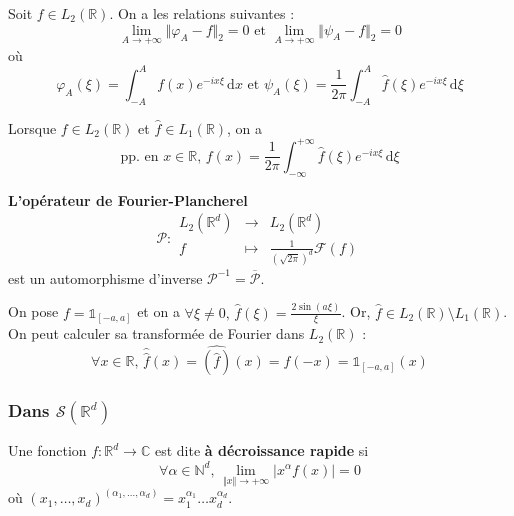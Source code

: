 	\begin{proposition}
		Soit $f \in L_2(\mathbb{R})$. On a les relations suivantes :
		\[ \lim_{A \rightarrow +\infty} \Vert \varphi_A - f \Vert_2 = 0 \text{ et } \lim_{A \rightarrow +\infty} \Vert \psi_A - f \Vert_2 = 0 \]
		où
		\[ \varphi_A(\xi) = \int_{-A}^{A} f(x) e^{-ix\xi} \, \mathrm{d}x \text{ et } \psi_A(\xi) = \frac{1}{2 \pi} \int_{-A}^{A} \widehat{f}(\xi) e^{-ix\xi} \, \mathrm{d}\xi \]
	\end{proposition}
	
	\begin{corollary}
		Lorsque $f \in L_2(\mathbb{R})$ et $\widehat{f} \in L_1(\mathbb{R})$, on a
		\[ \text{pp. en } x \in \mathbb{R}, \, f(x) = \frac{1}{2 \pi} \int_{-\infty}^{+\infty} \widehat{f}(\xi) e^{-ix\xi} \, \mathrm{d}\xi \]
	\end{corollary}
	
	\begin{theorem}
		\textbf{L'opérateur de Fourier-Plancherel}
		\[
		\mathcal{P} :
		\begin{array}{ccc}
			L_2(\mathbb{R}^d) &\rightarrow& L_2(\mathbb{R}^d) \\
			f &\mapsto& \frac{1}{(\sqrt{2 \pi})^d} \mathcal{F}(f)
		\end{array}
		\]
		est un automorphisme d'inverse $\mathcal{P}^{-1} = \overline{\mathcal{P}}$.
	\end{theorem}
	
	
	\begin{example}
		On pose $f = \mathbb{1}_{[-a, a]}$ et on a $\forall \xi \neq 0, \, \widehat{f}(\xi) = \frac{2 \sin(a\xi)}{\xi}$. Or, $\widehat{f} \in L_2(\mathbb{R}) \setminus L_1(\mathbb{R})$. On peut calculer sa transformée de Fourier dans $L_2(\mathbb{R})$ :
		\[ \forall x \in \mathbb{R}, \, \widehat{\widehat{f}}(x) = \widehat{(\widehat{f})}(x) = f(-x) = \mathbb{1}_{[-a, a]}(x) \]
	\end{example}
	
	\subsubsection{Dans \texorpdfstring{$\mathcal{S}(\mathbb{R}^d)$}{S(Rᵈ)}}
	
	
	\begin{definition}
		Une fonction $f : \mathbb{R}^d \rightarrow \mathbb{C}$ est dite \textbf{à décroissance rapide} si
		\[ \forall \alpha \in \mathbb{N}^d, \, \lim_{\Vert x \Vert \rightarrow +\infty} \vert x^\alpha f(x) \vert = 0 \]
		où $(x_1, \dots, x_d)^{(\alpha_1, \dots, \alpha_d)} = x_1^{\alpha_1} \dots x_d^{\alpha_d}$.
	\end{definition}
	
